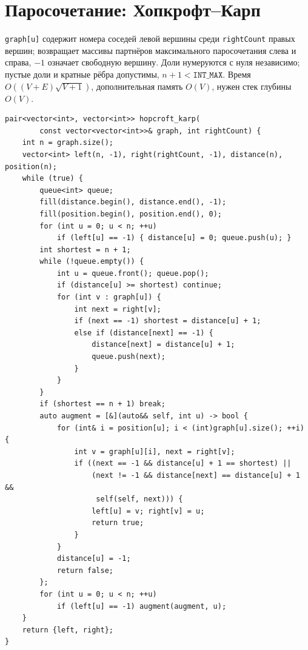 \section{Паросочетание: Хопкрофт--Карп}
\texttt{graph[u]} содержит номера соседей левой вершины среди \texttt{rightCount} правых вершин; возвращает массивы партнёров максимального паросочетания слева и справа, $-1$ означает свободную вершину.
Доли нумеруются с нуля независимо; пустые доли и кратные рёбра допустимы, $n+1<\texttt{INT\_MAX}$.
Время $O((V+E)\sqrt{V+1})$, дополнительная память $O(V)$, нужен стек глубины $O(V)$.
\begin{lstlisting}[name=advanced_graph_hopcroft_karp]
pair<vector<int>, vector<int>> hopcroft_karp(
        const vector<vector<int>>& graph, int rightCount) {
    int n = graph.size();
    vector<int> left(n, -1), right(rightCount, -1), distance(n), position(n);
    while (true) {
        queue<int> queue;
        fill(distance.begin(), distance.end(), -1);
        fill(position.begin(), position.end(), 0);
        for (int u = 0; u < n; ++u)
            if (left[u] == -1) { distance[u] = 0; queue.push(u); }
        int shortest = n + 1;
        while (!queue.empty()) {
            int u = queue.front(); queue.pop();
            if (distance[u] >= shortest) continue;
            for (int v : graph[u]) {
                int next = right[v];
                if (next == -1) shortest = distance[u] + 1;
                else if (distance[next] == -1) {
                    distance[next] = distance[u] + 1;
                    queue.push(next);
                }
            }
        }
        if (shortest == n + 1) break;
        auto augment = [&](auto&& self, int u) -> bool {
            for (int& i = position[u]; i < (int)graph[u].size(); ++i) {
                int v = graph[u][i], next = right[v];
                if ((next == -1 && distance[u] + 1 == shortest) ||
                    (next != -1 && distance[next] == distance[u] + 1 &&
                     self(self, next))) {
                    left[u] = v; right[v] = u;
                    return true;
                }
            }
            distance[u] = -1;
            return false;
        };
        for (int u = 0; u < n; ++u)
            if (left[u] == -1) augment(augment, u);
    }
    return {left, right};
}
\end{lstlisting}
